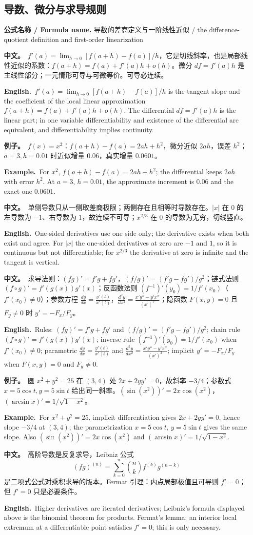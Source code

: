 \documentclass[UTF8,11pt,a4paper]{ctexart}
\newcommand{\BOTH}[2]{\par\noindent\textbf{中文。}\ #1\par\noindent\textbf{English.}\ #2\par}
\newcommand{\EX}[2]{\par\noindent\textbf{例子。}\ #1\par\noindent\textbf{Example.}\ #2\par}
\newcommand{\FORMULA}[2]{\par\noindent\textbf{公式名称 / Formula name.} #1 / #2\par}
\begin{document}
\subsection{导数、微分与求导规则}
\FORMULA{导数的差商定义与一阶线性近似}{the difference-quotient definition and first-order linearization}
\BOTH{$f'(a)=\lim_{h\to0}[f(a+h)-f(a)]/h$，它是切线斜率，也是局部线性近似的系数：$f(a+h)=f(a)+f'(a)h+o(h)$。微分 $df=f'(a)h$ 是主线性部分；一元情形可导与可微等价。可导必连续。}{$f'(a)=\lim_{h\to0}[f(a+h)-f(a)]/h$ is the tangent slope and the coefficient of the local linear approximation $f(a+h)=f(a)+f'(a)h+o(h)$. The differential $df=f'(a)h$ is the linear part; in one variable differentiability and existence of the differential are equivalent, and differentiability implies continuity.}
\EX{$f(x)=x^2$：$f(a+h)-f(a)=2ah+h^2$，微分近似 $2ah$，误差 $h^2$；$a=3,h=0.01$ 时近似增量 $0.06$，真实增量 $0.0601$。}{For $x^2$, $f(a+h)-f(a)=2ah+h^2$; the differential keeps $2ah$ with error $h^2$. At $a=3$, $h=0.01$, the approximate increment is $0.06$ and the exact one $0.0601$.}
\BOTH{单侧导数只从一侧取差商极限；两侧存在且相等时导数存在。$|x|$ 在 $0$ 的左导数为 $-1$、右导数为 $1$，故连续不可导；$x^{2/3}$ 在 $0$ 的导数为无穷，切线竖直。}{One-sided derivatives use one side only; the derivative exists when both exist and agree. For $|x|$ the one-sided derivatives at zero are $-1$ and $1$, so it is continuous but not differentiable; for $x^{2/3}$ the derivative at zero is infinite and the tangent is vertical.}
\BOTH{求导法则：$(fg)'=f'g+fg'$，$(f/g)'=(f'g-fg')/g^2$；链式法则 $(f\circ g)'=f'(g(x))g'(x)$；反函数法则 $(f^{-1})'(y_0)=1/f'(x_0)$（$f'(x_0)\ne0$）；参数方程 $\frac{dy}{dx}=\frac{y'(t)}{x'(t)}$，$\frac{d^2y}{dx^2}=\frac{x'y''-y'x''}{(x')^3}$；隐函数 $F(x,y)=0$ 且 $F_y\ne0$ 时 $y'=-F_x/F_y$。}{Rules: $(fg)'=f'g+fg'$ and $(f/g)'=(f'g-fg')/g^2$; chain rule $(f\circ g)'=f'(g(x))g'(x)$; inverse rule $(f^{-1})'(y_0)=1/f'(x_0)$ when $f'(x_0)\ne0$; parametric $\frac{dy}{dx}=\frac{y'(t)}{x'(t)}$ and $\frac{d^2y}{dx^2}=\frac{x'y''-y'x''}{(x')^3}$; implicit $y'=-F_x/F_y$ when $F(x,y)=0$ and $F_y\ne0$.}
\EX{圆 $x^2+y^2=25$ 在 $(3,4)$ 处 $2x+2yy'=0$，故斜率 $-3/4$；参数式 $x=5\cos t,y=5\sin t$ 给出同一斜率。$(\sin(x^2))'=2x\cos(x^2)$，$(\arcsin x)'=1/\sqrt{1-x^2}$。}{For $x^2+y^2=25$, implicit differentiation gives $2x+2yy'=0$, hence slope $-3/4$ at $(3,4)$; the parametrization $x=5\cos t$, $y=5\sin t$ gives the same slope. Also $(\sin(x^2))'=2x\cos(x^2)$ and $(\arcsin x)'=1/\sqrt{1-x^2}$.}
\BOTH{高阶导数是反复求导，Leibniz 公式
\[
(fg)^{(n)}=\sum_{k=0}^n\binom nk f^{(k)}g^{(n-k)}
\]
是二项式公式对乘积求导的版本。Fermat 引理：内点局部极值且可导则 $f'=0$；但 $f'=0$ 只是必要条件。}{Higher derivatives are iterated derivatives; Leibniz's formula displayed above is the binomial theorem for products. Fermat's lemma: an interior local extremum at a differentiable point satisfies $f'=0$; this is only necessary.}
\end{document}
